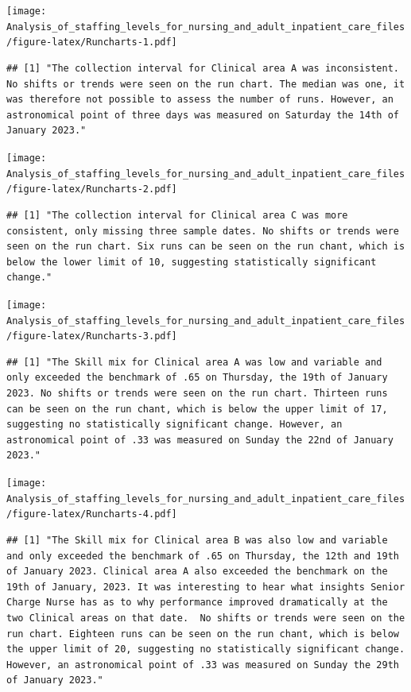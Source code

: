 \documentclass[
]{article}
\begin{document}
\texttt{[image: Analysis\_of\_staffing\_levels\_for\_nursing\_and\_adult\_inpatient\_care\_files/figure-latex/Runcharts-1.pdf]}

\begin{verbatim}
## [1] "The collection interval for Clinical area A was inconsistent. No shifts or trends were seen on the run chart. The median was one, it was therefore not possible to assess the number of runs. However, an astronomical point of three days was measured on Saturday the 14th of January 2023."
\end{verbatim}

\texttt{[image: Analysis\_of\_staffing\_levels\_for\_nursing\_and\_adult\_inpatient\_care\_files/figure-latex/Runcharts-2.pdf]}

\begin{verbatim}
## [1] "The collection interval for Clinical area C was more consistent, only missing three sample dates. No shifts or trends were seen on the run chart. Six runs can be seen on the run chant, which is below the lower limit of 10, suggesting statistically significant change."
\end{verbatim}

\texttt{[image: Analysis\_of\_staffing\_levels\_for\_nursing\_and\_adult\_inpatient\_care\_files/figure-latex/Runcharts-3.pdf]}

\begin{verbatim}
## [1] "The Skill mix for Clinical area A was low and variable and only exceeded the benchmark of .65 on Thursday, the 19th of January 2023. No shifts or trends were seen on the run chart. Thirteen runs can be seen on the run chant, which is below the upper limit of 17, suggesting no statistically significant change. However, an astronomical point of .33 was measured on Sunday the 22nd of January 2023."
\end{verbatim}

\texttt{[image: Analysis\_of\_staffing\_levels\_for\_nursing\_and\_adult\_inpatient\_care\_files/figure-latex/Runcharts-4.pdf]}

\begin{verbatim}
## [1] "The Skill mix for Clinical area B was also low and variable and only exceeded the benchmark of .65 on Thursday, the 12th and 19th of January 2023. Clinical area A also exceeded the benchmark on the 19th of January, 2023. It was interesting to hear what insights Senior Charge Nurse has as to why performance improved dramatically at the two Clinical areas on that date.  No shifts or trends were seen on the run chart. Eighteen runs can be seen on the run chant, which is below the upper limit of 20, suggesting no statistically significant change. However, an astronomical point of .33 was measured on Sunday the 29th of January 2023."
\end{verbatim}
\end{document}
